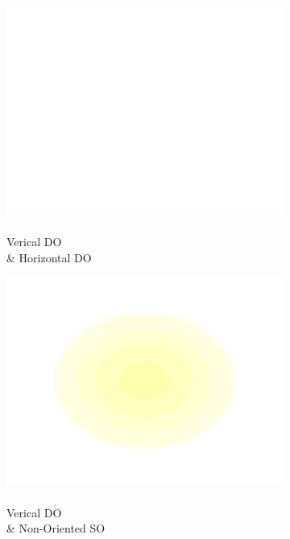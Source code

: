 \documentclass[journal,onecolumn]{IEEEtran}
\begin{document}
\begin{figure}[h]
\begin{subfigure}[b]{0.2\textwidth}
            \centering
            \captionsetup{justification=centering}
            \includegraphics[width=.85\linewidth]{j_blank}
            \caption{\\ Verical DO \\ \& Horizontal DO}
    \end{subfigure}%
    \begin{subfigure}[b]{0.2\textwidth}
            \centering
            \captionsetup{justification=centering}
            \includegraphics[width=.85\linewidth]{j_1_4}
            \caption{\\ Verical DO \\ \& Non-Oriented SO}
    \end{subfigure}%
    \par \bigskip
    \begin{subfigure}[b]{0.2\textwidth}
            \centering
            \captionsetup{justification=centering}

\end{subfigure}
\end{figure}
\end{document}
